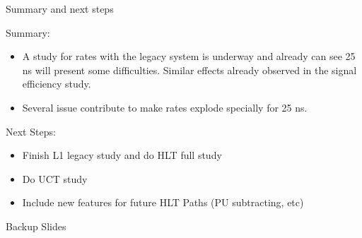 \documentclass[8pt]{beamer}
\begin{document}
\begin{frame}{Summary and next steps}
 
\begin{block}{Summary:}
 
\begin{itemize}
  \item A study for rates with the legacy system is underway and already can see 25 ns will present some difficulties. Similar effects already observed in the signal efficiency study.
  \item Several issue contribute to make rates explode specially for 25 ns.
\end{itemize}

\end{block}

\begin{block}{Next Steps:}
 
\begin{itemize}
  \item Finish L1 legacy study and do HLT full study
  \item Do UCT study
  \item Include new features for future HLT Paths (PU subtracting, etc) 
\end{itemize}
 
\end{block}

\end{frame}

\appendix
\begin{frame}
 
\begin{block}

\begin{center}Backup Slides\end{center}

\end{block}

\end{frame}

% 
\end{document}
